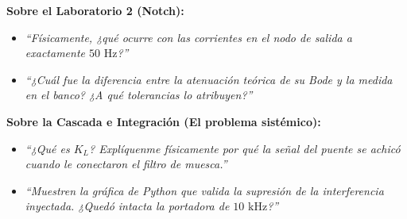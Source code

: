 \documentclass[11pt,a4paper,twoside]{article}
\begin{document}
\textbf{Sobre el Laboratorio 2 (Notch):}
\begin{itemize}[itemsep=1pt]
    \item \textit{``Físicamente, ¿qué ocurre con las corrientes en el nodo de salida a exactamente $50\text{ Hz}$?''}
    \item \textit{``¿Cuál fue la diferencia entre la atenuación teórica de su Bode y la medida en el banco? ¿A qué tolerancias lo atribuyen?''}
\end{itemize}

\textbf{Sobre la Cascada e Integración (El problema sistémico):}
\begin{itemize}[itemsep=1pt]
    \item \textit{``¿Qué es $K_L$? Explíquenme físicamente por qué la señal del puente se achicó cuando le conectaron el filtro de muesca.''}
    \item \textit{``Muestren la gráfica de Python que valida la supresión de la interferencia inyectada. ¿Quedó intacta la portadora de $10\text{ kHz}$?''}
\end{itemize}
\end{document}
